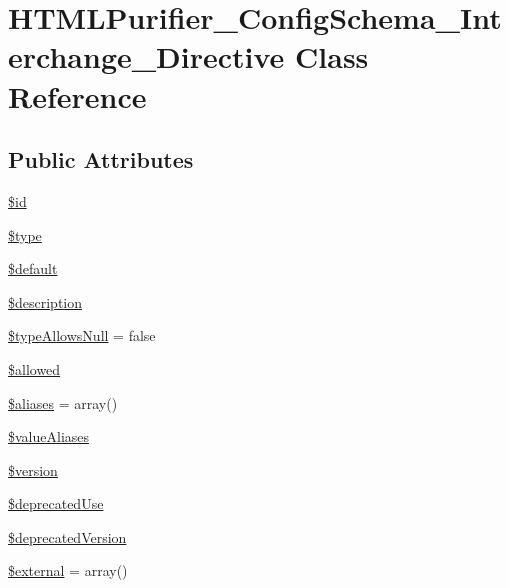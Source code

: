 \hypertarget{classHTMLPurifier__ConfigSchema__Interchange__Directive}{\section{H\+T\+M\+L\+Purifier\+\_\+\+Config\+Schema\+\_\+\+Interchange\+\_\+\+Directive Class Reference}
\label{classHTMLPurifier__ConfigSchema__Interchange__Directive}
}
\subsection*{Public Attributes}
\begin{DoxyCompactItemize}
\item 
\hyperlink{classHTMLPurifier__ConfigSchema__Interchange__Directive_a1e4055feb63312cee8eccf13bd6ffd7c}{\$id}
\item 
\hyperlink{classHTMLPurifier__ConfigSchema__Interchange__Directive_a1653790e5969bbf12bd9094ce9949a77}{\$type}
\item 
\hyperlink{classHTMLPurifier__ConfigSchema__Interchange__Directive_a85b4dde959b966c7c449a3a1c82903e9}{\$default}
\item 
\hyperlink{classHTMLPurifier__ConfigSchema__Interchange__Directive_a5d3ce181f3e8b87fd14383a303998031}{\$description}
\item 
\hyperlink{classHTMLPurifier__ConfigSchema__Interchange__Directive_a4ebab550b459e3460d32dda71e7bfdba}{\$type\+Allows\+Null} = false
\item 
\hyperlink{classHTMLPurifier__ConfigSchema__Interchange__Directive_a26ae514188fab0a906ac047821e7e89d}{\$allowed}
\item 
\hyperlink{classHTMLPurifier__ConfigSchema__Interchange__Directive_adcf03d73d17bb87e36b6d745b26d448c}{\$aliases} = array()
\item 
\hyperlink{classHTMLPurifier__ConfigSchema__Interchange__Directive_aff1f970448156697608aa14a8bcef760}{\$value\+Aliases}
\item 
\hyperlink{classHTMLPurifier__ConfigSchema__Interchange__Directive_a330b67667a9b8152679b906bbdcd58c1}{\$version}
\item 
\hyperlink{classHTMLPurifier__ConfigSchema__Interchange__Directive_ace5b3be427b3ef113d5eb2ded908c589}{\$deprecated\+Use}
\item 
\hyperlink{classHTMLPurifier__ConfigSchema__Interchange__Directive_a663449eb7012bf8977efac0fcf681861}{\$deprecated\+Version}
\item 
\hyperlink{classHTMLPurifier__ConfigSchema__Interchange__Directive_a36350af665d522b6a0b25bedc477d79a}{\$external} = array()
\end{DoxyCompactItemize}


